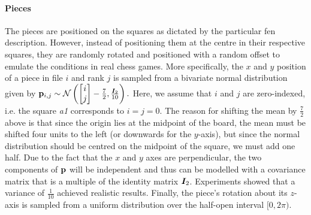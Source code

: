 \paragraph{Pieces}
The pieces are positioned on the squares as dictated by the particular \gls{fen} description.
However, instead of positioning them at the centre in their respective squares, they are randomly rotated and positioned with a random offset to emulate the conditions in real chess games.
More specifically, the $x$ and $y$ position of a piece in file $i$ and rank $j$ is sampled from a bivariate normal distribution given by
\(
    {\mathbf{p}}_{i,j} \sim \mathcal{N} \left(
        \begin{bmatrix}
            i \\ j
        \end{bmatrix} - \frac{7}{2},
        \frac{{\bm{I}}_2}{10}
    \right).
\)
Here, we assume that $i$ and $j$ are zero-indexed, i.e. the square \emph{a1} corresponds to $i=j=0$.
The reason for shifting the mean by $\frac{7}{2}$ above is that since the origin lies at the midpoint of the board, the mean must be shifted four units to the left (or downwards for the $y$-axis), but since the normal distribution should be centred on the midpoint of the square, we must add one half.
Due to the fact that the $x$ and $y$ axes are perpendicular, the two components of ${\mathbf{p}}$ will be independent and thus can be modelled with a covariance matrix that is a multiple of the identity matrix ${\bm{I}}_2$.
Experiments showed that a variance of $\frac{1}{10}$ achieved realistic results.
Finally, the piece's rotation about its $z$-axis is sampled from a uniform distribution over the half-open interval $[0, 2\pi)$.

